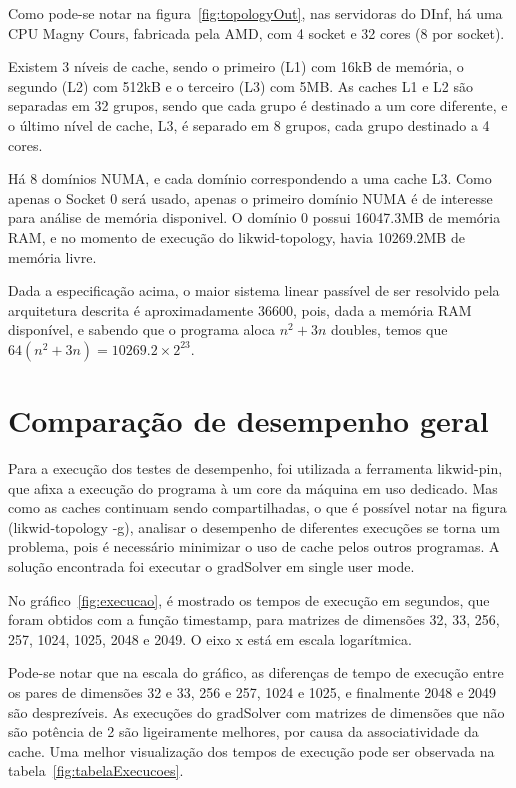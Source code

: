 \documentclass[12pt]{article}
\begin{document}
Como pode-se notar na figura~\ref{fig:topologyOut}, nas servidoras do DInf, há
uma CPU Magny Cours, fabricada pela AMD, com 4 socket e 32 cores (8 por socket).

Existem 3 níveis de cache, sendo o primeiro (L1) com 16kB de memória, o segundo
(L2) com 512kB e o terceiro (L3) com 5MB. As caches L1 e L2 são separadas em 32
grupos, sendo que cada grupo é destinado a um core diferente, e o último nível
de cache, L3, é separado em 8 grupos, cada grupo destinado a 4 cores.

Há 8 domínios NUMA, e cada domínio correspondendo a uma cache L3. Como apenas o
Socket 0 será usado, apenas o primeiro domínio NUMA é de interesse para análise
de memória disponivel. O domínio 0 possui 16047.3MB de memória RAM, e no momento
de execução do likwid-topology, havia 10269.2MB de memória livre.

Dada a especificação acima, o maior sistema linear passível de ser resolvido
pela arquitetura descrita é aproximadamente 36600, pois, dada a memória RAM
disponível, e sabendo que o programa aloca $n^2 + 3n$ doubles, temos que $64(n^2 +
3n) = 10269.2\times2^{23}$.

\section{Comparação de desempenho geral}\label{sec:desempenhoGeral}

Para a execução dos testes de desempenho, foi utilizada a ferramenta likwid-pin,
que afixa a execução do programa à um core da máquina em uso dedicado. Mas como
as caches continuam sendo compartilhadas, o que é possível notar na figura
(likwid-topology -g), analisar o desempenho de diferentes execuções se torna um
problema, pois é necessário minimizar o uso de cache pelos outros programas. A
solução encontrada foi executar o gradSolver em single user mode.

No gráfico~\ref{fig:execucao}, é mostrado os tempos de execução em segundos, que
foram obtidos com a função timestamp, para matrizes de dimensões 32, 33, 256,
257, 1024, 1025, 2048 e 2049. O eixo x está em escala logarítmica.

Pode-se notar que na escala do gráfico, as diferenças de tempo de execução entre
os pares de dimensões 32 e 33, 256 e 257, 1024 e 1025, e finalmente 2048 e 2049
são desprezíveis. As execuções do gradSolver com matrizes de dimensões que não
são potência de 2 são ligeiramente melhores, por causa da associatividade da
cache. Uma melhor visualização dos tempos de execução pode ser observada na
tabela~\ref{fig:tabelaExecucoes}.
\end{document}
